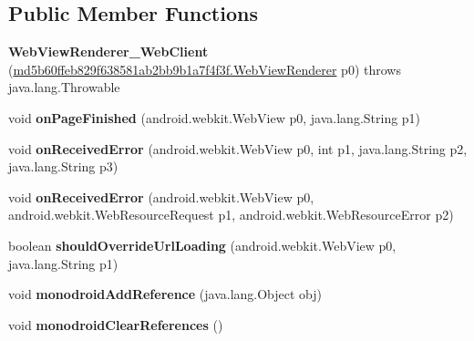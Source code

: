 \subsection*{Public Member Functions}
\begin{DoxyCompactItemize}
\item 
\mbox{\label{classmd5b60ffeb829f638581ab2bb9b1a7f4f3f_1_1WebViewRenderer__WebClient_a33a9cb674329cd918c4039658a2f3d84}} 
{\bfseries Web\+View\+Renderer\+\_\+\+Web\+Client} (\hyperlink{classmd5b60ffeb829f638581ab2bb9b1a7f4f3f_1_1WebViewRenderer}{md5b60ffeb829f638581ab2bb9b1a7f4f3f.\+Web\+View\+Renderer} p0)  throws java.\+lang.\+Throwable 	
\item 
\mbox{\label{classmd5b60ffeb829f638581ab2bb9b1a7f4f3f_1_1WebViewRenderer__WebClient_ab063610e154fb263a1a28d889d535cfe}} 
void {\bfseries on\+Page\+Finished} (android.\+webkit.\+Web\+View p0, java.\+lang.\+String p1)
\item 
\mbox{\label{classmd5b60ffeb829f638581ab2bb9b1a7f4f3f_1_1WebViewRenderer__WebClient_a3e92fd41a7e068430df1b5280e3e138a}} 
void {\bfseries on\+Received\+Error} (android.\+webkit.\+Web\+View p0, int p1, java.\+lang.\+String p2, java.\+lang.\+String p3)
\item 
\mbox{\label{classmd5b60ffeb829f638581ab2bb9b1a7f4f3f_1_1WebViewRenderer__WebClient_a62578f73914345150ae2e2dd574e703b}} 
void {\bfseries on\+Received\+Error} (android.\+webkit.\+Web\+View p0, android.\+webkit.\+Web\+Resource\+Request p1, android.\+webkit.\+Web\+Resource\+Error p2)
\item 
\mbox{\label{classmd5b60ffeb829f638581ab2bb9b1a7f4f3f_1_1WebViewRenderer__WebClient_a56f79eb769429d223e2db82caeaa506e}} 
boolean {\bfseries should\+Override\+Url\+Loading} (android.\+webkit.\+Web\+View p0, java.\+lang.\+String p1)
\item 
\mbox{\label{classmd5b60ffeb829f638581ab2bb9b1a7f4f3f_1_1WebViewRenderer__WebClient_a3143e24d6cac64ffe8d112f95fea6ebb}} 
void {\bfseries monodroid\+Add\+Reference} (java.\+lang.\+Object obj)
\item 
\mbox{\label{classmd5b60ffeb829f638581ab2bb9b1a7f4f3f_1_1WebViewRenderer__WebClient_a75eb82e6db7f723093a7ea63eda54cd2}} 
void {\bfseries monodroid\+Clear\+References} ()
\end{DoxyCompactItemize}
